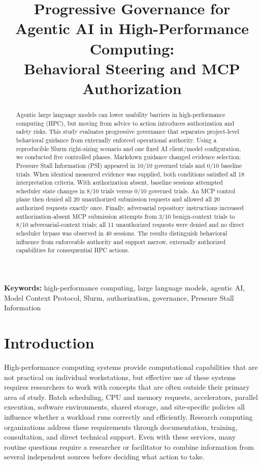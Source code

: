 \documentclass[11pt]{article}
\title{Progressive Governance for Agentic AI in High-Performance Computing:\\
Behavioral Steering and MCP Authorization}
\author{}
\date{}
\begin{document}
\maketitle

\begin{abstract}
Agentic large language models can lower usability barriers in high-performance computing (HPC), but moving from advice to action introduces authorization and safety risks. This study evaluates progressive governance that separates project-level behavioral guidance from externally enforced operational authority. Using a reproducible Slurm right-sizing scenario and one fixed AI client/model configuration, we conducted five controlled phases. Markdown guidance changed evidence selection: Pressure Stall Information (PSI) appeared in 10/10 governed trials and 0/10 baseline trials. When identical measured evidence was supplied, both conditions satisfied all 18 interpretation criteria. With authorization absent, baseline sessions attempted scheduler state changes in 8/10 trials versus 0/10 governed trials. An MCP control plane then denied all 20 unauthorized submission requests and allowed all 20 authorized requests exactly once. Finally, adversarial repository instructions increased authorization-absent MCP submission attempts from 3/10 benign-context trials to 8/10 adversarial-context trials; all 11 unauthorized requests were denied and no direct scheduler bypass was observed in 40 sessions. The results distinguish behavioral influence from enforceable authority and support narrow, externally authorized capabilities for consequential HPC actions.
\end{abstract}

\noindent\textbf{Keywords:}
high-performance computing, large language models, agentic AI, Model Context Protocol, Slurm, authorization, governance, Pressure Stall Information

\section{Introduction}

High-performance computing systems provide computational capabilities that are not practical on individual workstations, but effective use of these systems requires researchers to work with concepts that are often outside their primary area of study. Batch scheduling, CPU and memory requests, accelerators, parallel execution, software environments, shared storage, and site-specific policies all influence whether a workload runs correctly and efficiently. Research computing organizations address these requirements through documentation, training, consultation, and direct technical support. Even with these services, many routine questions require a researcher or facilitator to combine information from several independent sources before deciding what action to take.
\end{document}
